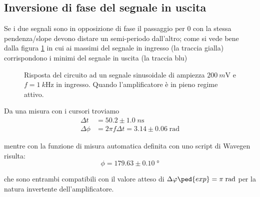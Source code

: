 \documentclass[10pt,a4paper]{article}
\begin{document}
\subsection{Inversione di fase del segnale in uscita}
Se i due segnali sono in opposizione di fase il passaggio per 0 con la stessa
pendenza/slope devono distare un semi-periodo dall'altro; come si vede bene
dalla figura \ref{fig: Alin} in cui ai massimi del segnale in ingresso (la
traccia gialla) corrispondono i minimi del segnale in uscita (la traccia blu)
\begin{figure}[htb]
\centering
\caption{Risposta del circuito ad un segnale sinusoidale di ampiezza
$\SI{200}{m\V}$ e $f = \SI{1}{k\Hz}$ in ingresso. Quando l'amplificatore
è in pieno regime attivo. \label{fig: Alin}}
\end{figure}

Da una misura con i cursori troviamo
\begin{align*}
\Delta t &= 50.2 \pm 1.0 \; \si{n\s}\\
\Delta \phi &= 2\pi f \Delta t = 3.14 \pm 0.06 \; \si{\radian}
\end{align*}

mentre con la funzione di misura automatica definita con uno script di Wavegen
risulta:
\[
\phi = 179.63 \pm 0.10 \; \si{\degree}
\]

che sono entrambi compatibili con il valore atteso di $\Delta \phi\ped{exp}
= \pi \; \si{\radian}$ per la natura invertente dell'amplificatore.
\end{document}
